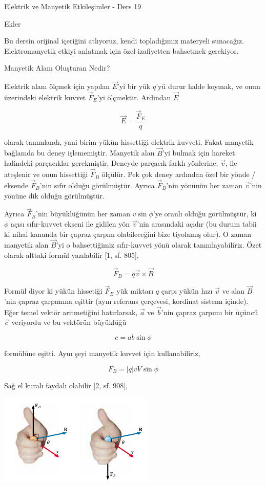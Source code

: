 \documentclass[12pt,fleqn]{article}\usepackage{../../common}
\begin{document}
Elektrik ve Manyetik Etkileşimler - Ders 19

Ekler

Bu dersin orijinal içeriğini atlıyoruz, kendi topladığımız materyeli
sunacağız. Elektromanyetik etkiyi anlatmak için özel izafiyetten bahsetmek
gerekiyor.

Manyetik Alanı Oluşturan Nedir?

Elektrik alanı ölçmek için yapılan $\vec{E}$'yi bir yük $q$'yü durur halde
koymak, ve onun üzerindeki elektrik kuvvet $\vec{F}_E$'yi ölçmektir. Ardindan
$\vec{E}$

$$
\vec{E} = \frac{\vec{F}_E}{q}
$$

olarak tanımlandı, yani birim yükün hissettiği elektrik kuvveti. Fakat manyetik
bağlamda bu deney işlememiştir. Manyetik alan $\vec{B}$'yi bulmak için hareket
halindeki parçacıklar gerekmiştir. Deneyde parçacık farklı yönlerine, $\vec{v}$,
ile ateşlenir ve onun hissettiği $\vec{F}_B$ ölçülür. Pek çok deney ardından
özel bir yönde / eksende $\vec{F}_B$'nin sıfır olduğu görülmüştür. Ayrıca
$\vec{F}_B$'nin yönünün her zaman $\vec{v}$'nin yönüne dik olduğu görülmüştür.

Ayrıca $\vec{F}_B$'nin büyüklüğünün her zaman $v \sin\phi$'ye oranlı olduğu
görülmüştür, ki $\phi$ açısı sıfır-kuvvet ekseni ile gidilen yön $\vec{v}$'nin
arasındaki açıdır (bu durum tabii ki nihai kanunda bir çapraz çarpım
olabileceğini bize tiyolamış olur). O zaman manyetik alan $\vec{B}$'yi o
bahsettiğimiz sıfır-kuvvet yönü olarak tanımlayabiliriz. Özet olarak alttaki
formül yazılabilir [1, sf. 805],

$$
\vec{F}_B = q \vec{v} \times \vec{B}
$$

Formül diyor ki yükün hissetiği $\vec{F}_B$ yük miktarı $q$ çarpı yükün hızı
$\vec{v}$ ve alan $\vec{B}$'nin çapraz çarpımına eşittir (aynı referans
çerçevesi, kordinat sistemı içinde). Eğer temel vektör aritmetiğini hatırlarsak,
$\vec{a}$ ve $\vec{b}$'nin çapraz çarpımı bir üçüncü $\vec{c}$ veriyordu ve bu
vektörün büyüklüğü

$$
c = a b \sin \phi
$$

formülüne eşitti. Aynı şeyi manyetik kuvvet için kullanabiliriz,

$$
F_B = |q| v V \sin\phi
$$

Sağ el kuralı faydalı olabilir [2, sf. 908],

\includegraphics[width=20em]{19_01.png}
\end{document}
